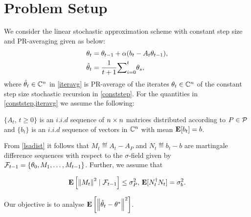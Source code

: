 \documentclass{article}
\begin{document}
\section{Problem Setup}
We consider the linear stochastic approximation scheme with constant step size and PR-averaging given as below:
\begin{align}
\label{conststep} \theta_t&=\theta_{t-1}+\alpha(b_t-A_t\theta_{t-1}),\\
\label{iteravg} \thh_t&=\frac{1}{t+1}{\sum}_{i=0}^{t}\theta_s,
\end{align}
where $\thh_t\in \C^{n}$ in \eqref{iteravg} is PR-average of the iterates $\theta_t\in \C^{n}$ of the constant step size stochastic recursion in \eqref{conststep}. For the quantities in \eqref{conststep,iteravg} we assume the following:
\begin{assumption}\label{lsadist}
$\{A_t,\, t\geq 0\}$ is an $i.i.d$ sequence of $\ncn$ matrices distributed according to $P\in \P$ and $\{b_t\}$ is an $i.i.d$ sequence of vectors in $\C^n$ with mean $\E[b_t]=b$.
\end{assumption}
From \cref{lsadist} it follows that $M_t\eqdef A_t-A_P$ and $N_t\eqdef b_t-b$ are martingale difference sequences with respect to the $\sigma$-field given by $\F_{t-1}=\{\theta_0,M_1,\ldots, M_{t-1}\}$.
Further, we assume that
\begin{assumption}\label{matvar}
\begin{align*}\E\left[ \norm{M_t}^2\mid\F_{t-1}\right]\leq \sigma^2_P, \, \E[N_t^\dag N_t]=\sigma_b^2.\end{align*}
\end{assumption}

Our objective is to analyse $\EE{\norm{\thh_t-\theta^*}^2}$.

\begin{example}[TD(0)]
\end{example}

\begin{example}
\end{example}

\end{document}
